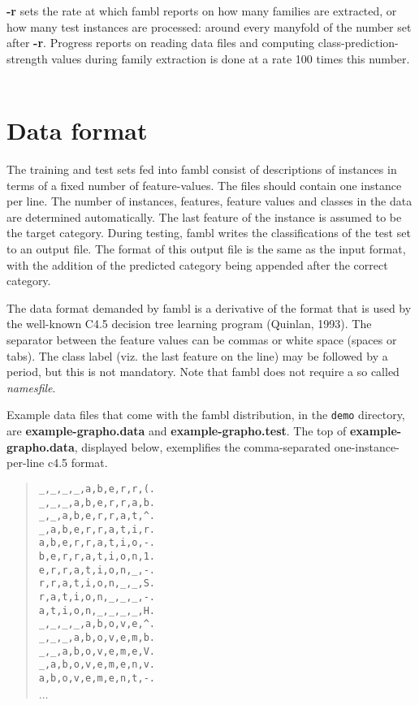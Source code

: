 \documentclass[11pt]{article}
\begin{document}
{\bf -r} sets the rate at which {\sc fambl} reports on how many
families are extracted, or how many test instances are processed:
around every manyfold of the number set after {\bf -r}. Progress
reports on reading data files and computing class-prediction-strength
values during family extraction is done at a rate 100 times this
number.  \ \\

\section{Data format}
\label{format}

The training and test sets fed into {\sc fambl} consist of
descriptions of instances in terms of a fixed number of
feature-values. The files should contain one instance per line. The
number of instances, features, feature values and classes in the data
are determined automatically. The last feature of the instance is
assumed to be the target category. During testing, {\sc fambl} writes
the classifications of the test set to an output file. The format of
this output file is the same as the input format, with the addition of
the predicted category being appended after the correct category.

The data format demanded by {\sc fambl} is a derivative of the format
that is used by the well-known C4.5 decision tree learning program
(Quinlan, 1993).  The separator between the feature values can be
commas or white space (spaces or tabs). The class label (viz.  the
last feature on the line) may be followed by a period, but this is not
mandatory. Note that {\sc fambl} does not require a so called {\em
  namesfile}.

Example data files that come with the {\sc fambl} distribution, in the
{\tt demo} directory, are {\bf example-grapho.data} and {\bf
  example-grapho.test}. The top of {\bf example-grapho.data},
displayed below, exemplifies the comma-separated one-instance-per-line
{\sc c4.5} format.

\begin{quote}
{\tiny
\begin{verbatim}
_,_,_,_,a,b,e,r,r,(.
_,_,_,a,b,e,r,r,a,b.
_,_,a,b,e,r,r,a,t,^.
_,a,b,e,r,r,a,t,i,r.
a,b,e,r,r,a,t,i,o,-.
b,e,r,r,a,t,i,o,n,1.
e,r,r,a,t,i,o,n,_,-.
r,r,a,t,i,o,n,_,_,S.
r,a,t,i,o,n,_,_,_,-.
a,t,i,o,n,_,_,_,_,H.
_,_,_,_,a,b,o,v,e,^.
_,_,_,a,b,o,v,e,m,b.
_,_,a,b,o,v,e,m,e,V.
_,a,b,o,v,e,m,e,n,v.
a,b,o,v,e,m,e,n,t,-.
\end{verbatim}
$\ldots$
}
\end{quote}
\end{document}
